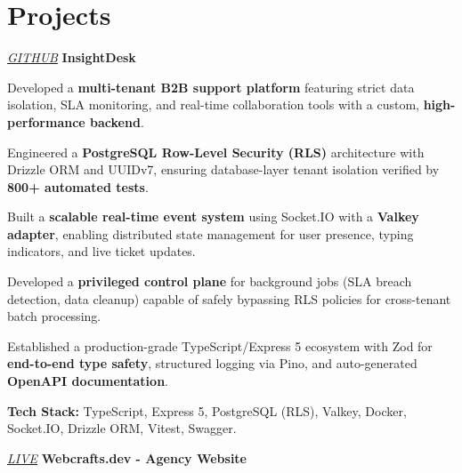 \section{Projects}

    \begin{twocolentry}{
    \textit{\href{https://github.com/ehsan18t/insight-desk}{GITHUB}}}
        \textbf{InsightDesk}
    \end{twocolentry}

    \begin{onecolentry}
        \begin{highlights}
            \item Developed a \textbf{multi-tenant B2B support platform} featuring strict data isolation, SLA monitoring, and real-time collaboration tools with a custom, \textbf{high-performance backend}.
            \item Engineered a \textbf{PostgreSQL Row-Level Security (RLS)} architecture with Drizzle ORM and UUIDv7, ensuring database-layer tenant isolation verified by \textbf{800+ automated tests}.
            \item Built a \textbf{scalable real-time event system} using Socket.IO with a \textbf{Valkey adapter}, enabling distributed state management for user presence, typing indicators, and live ticket updates.
            \item Developed a \textbf{privileged control plane} for background jobs (SLA breach detection, data cleanup) capable of safely bypassing RLS policies for cross-tenant batch processing.
            \item Established a production-grade TypeScript/Express 5 ecosystem with Zod for \textbf{end-to-end type safety}, structured logging via Pino, and auto-generated \textbf{OpenAPI documentation}.
            \item \textbf{Tech Stack:} TypeScript, Express 5, PostgreSQL (RLS), Valkey, Docker, Socket.IO, Drizzle ORM, Vitest, Swagger.
        \end{highlights}
    \end{onecolentry}
    \vspace{0.2 cm}

    \begin{twocolentry}{
    \textit{\href{https://www.webcrafts.dev/}{LIVE}}}
        \textbf{Webcrafts.dev - Agency Website}
    \end{twocolentry}
    
